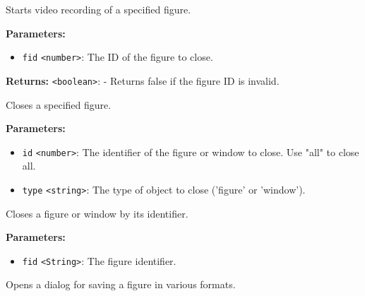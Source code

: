 \documentclass[12pt,a4paper]{article}
\begin{document}
\noindent Starts video recording of a specified figure.

\vspace{5mm}
\noindent {}


\noindent \textbf{Parameters:}
\begin{itemize}
  \item \texttt{fid} \texttt{<number>}: The ID of the figure to close.
\end{itemize}

\noindent \textbf{Returns:} \texttt{<boolean>}: - Returns false if the figure ID is invalid.

\noindent Closes a specified figure.

\vspace{5mm}
\noindent {}


\noindent \textbf{Parameters:}
\begin{itemize}
  \item \texttt{id} \texttt{<number>}: The identifier of the figure or window to close. Use "all" to close all.
  \item \texttt{type} \texttt{<string>}: The type of object to close ('figure' or 'window').
\end{itemize}

\noindent Closes a figure or window by its identifier.

\vspace{5mm}
\noindent {}


\noindent \textbf{Parameters:}
\begin{itemize}
  \item \texttt{fid} \texttt{<String>}: The figure identifier.
\end{itemize}

\noindent Opens a dialog for saving a figure in various formats.

\vspace{5mm}
\noindent {}
\end{document}
